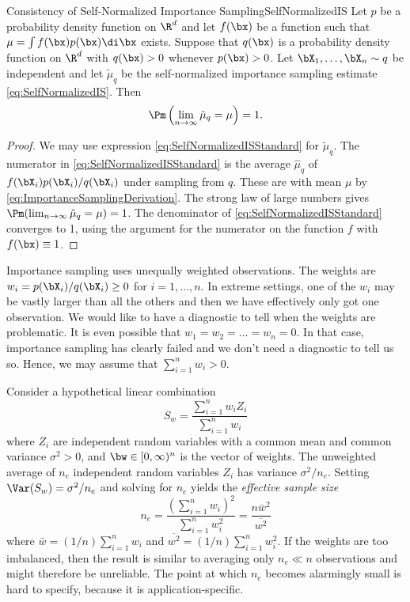 \begin{thm}{Consistency of Self-Normalized Importance Sampling}{SelfNormalizedIS}
	Let $p$ be a probability density function on $\R^d$ and let $f(\bx)$ be a function such that $\mu = \int f(\bx)p(\bx) \di \bx$ exists. Suppose that $q(\bx)$ is a probability density function on $\R^d$ with $q(\bx) > 0$ whenever $p(\bx) > 0$. Let $\bX_1, \dots, \bX_n \sim q$ be independent and let $\tilde{\mu}_q$ be the self-normalized importance sampling estimate \eqref{eq:SelfNormalizedIS}. Then
	\[
		\Pm \left( \lim_{n \to \infty} \tilde{\mu}_q = \mu \right) = 1.
	\]
\end{thm}

\begin{proof}
	We may use expression \eqref{eq:SelfNormalizedISStandard} for $\tilde{\mu}_q$. The numerator in \eqref{eq:SelfNormalizedISStandard} is the average $\hat{\mu}_q$ of $f(\bX_i)p(\bX_i)/q(\bX_i)$ under sampling from $q$. These are \iid with mean $\mu$ by \eqref{eq:ImportanceSamplingDerivation}. The strong law of large numbers gives $\Pm(\lim_{n \to \infty} \hat{\mu}_q = \mu) = 1$. The denominator of \eqref{eq:SelfNormalizedISStandard} converges to 1, using the argument for the numerator on the function $f$ with $f(\bx) \equiv 1$.
\end{proof}

Importance sampling uses unequally weighted observations. The weights are $w_i = p(\bX_i)/q(\bX_i) \geq 0$ for $i=1, \dots, n$. In extreme settings, one of the $w_i$ may be vastly larger than all the others and then we have effectively only got one observation. We would like to have a diagnostic to tell when the weights are problematic. It is even possible that $w_1 = w_2 = \dots = w_n = 0$. In that case, importance sampling has clearly failed and we don't need a diagnostic to tell us so. Hence, we may assume that $\sum_{i=1}^n w_i > 0$.

Consider a hypothetical linear combination
\begin{equation}
	S_w = \frac{\sum_{i=1}^n w_i Z_i}{\sum_{i=1}^n w_i}
	\label{eq:HypotheticalLinearComb}
\end{equation}
where $Z_i$ are independent random variables with a common mean and common variance $\sigma^2 > 0$, and $\bw \in [0, \infty)^n$ is the vector of weights. The unweighted average of $n_e$ independent random variables $Z_i$ has variance $\sigma^2/n_e$. Setting $\Var(S_w) = \sigma^2/n_e$ and solving for $n_e$ yields the \textit{effective sample size}
\begin{equation}
	n_e = \frac{(\sum_{i=1}^n w_i)^2}{\sum_{i=1}^n w_i^2} = \frac{n \bar{w}^2}{\overline{w^2}}
	\label{eq:EffectiveSampleSize}
\end{equation}
where $\bar{w} = (1/n) \sum_{i=1}^n w_i$ and $\overline{w^2} = (1/n) \sum_{i=1}^n w_i^2$. If the weights are too imbalanced, then the result is similar to averaging only $n_e \ll n$ observations and might therefore be unreliable. The point at which $n_e$ becomes alarmingly small is hard to specify, because it is application-specific.

